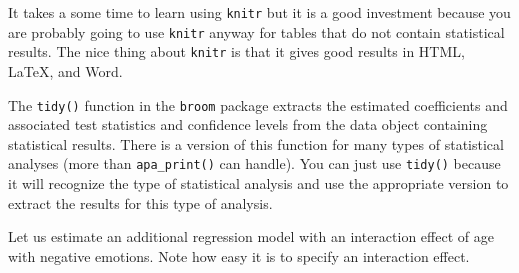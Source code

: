 \documentclass[doc,floatsintext]{apa6}
\begin{document}
It takes a some time to learn using \texttt{knitr} but it is a good
investment because you are probably going to use \texttt{knitr} anyway
for tables that do not contain statistical results. The nice thing about
\texttt{knitr} is that it gives good results in HTML, LaTeX, and Word.

The \texttt{tidy()} function in the \texttt{broom} package extracts the
estimated coefficients and associated test statistics and confidence
levels from the data object containing statistical results. There is a
version of this function for many types of statistical analyses (more
than \texttt{apa\_print()} can handle). You can just use \texttt{tidy()}
because it will recognize the type of statistical analysis and use the
appropriate version to extract the results for this type of analysis.

Let us estimate an additional regression model with an interaction
effect of age with negative emotions. Note how easy it is to specify an
interaction effect.
\end{document}
